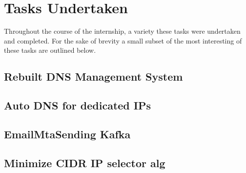 \chapter{Tasks Undertaken}
Throughout the course of the internship, a variety these tasks were undertaken and completed.  
For the sake of brevity a small subset of the most interesting of these tasks are outlined below. 

\section{Rebuilt DNS Management System}

\section{Auto DNS for dedicated IPs}

\section{EmailMtaSending Kafka}

\section{Minimize CIDR IP selector alg}